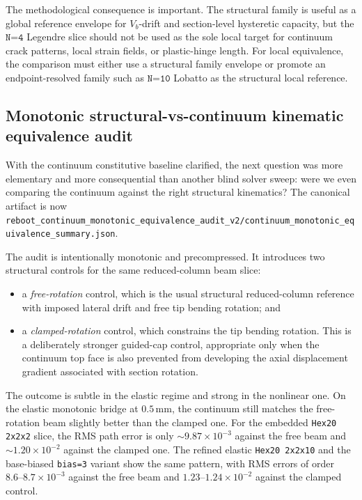 The methodological consequence is important.  The structural family is useful
as a global reference envelope for \(V_b\)-drift and section-level hysteretic
capacity, but the \(\texttt{N=4}\) Legendre slice should not be used as the
sole local target for continuum crack patterns, local strain fields, or
plastic-hinge length.  For local equivalence, the comparison must either use a
structural family envelope or promote an endpoint-resolved family such as
\(\texttt{N=10}\) Lobatto as the structural local reference.

\subsection{Monotonic structural-vs-continuum kinematic equivalence audit}

With the continuum constitutive baseline clarified, the next question was more
elementary and more consequential than another blind solver sweep: were we even
comparing the continuum against the right structural kinematics?  The
canonical artifact is now
\texttt{reboot\_continuum\_monotonic\_equivalence\_audit\_v2/continuum\_monotonic\_equivalence\_summary.json}.

The audit is intentionally monotonic and precompressed.  It introduces two
structural controls for the same reduced-column beam slice:
\begin{itemize}
  \item a \emph{free-rotation} control, which is the usual structural
    reduced-column reference with imposed lateral drift and free tip bending
    rotation; and
  \item a \emph{clamped-rotation} control, which constrains the tip bending
    rotation. This is a deliberately stronger guided-cap control, appropriate
    only when the continuum top face is also prevented from developing the
    axial displacement gradient associated with section rotation.
\end{itemize}

The outcome is subtle in the elastic regime and strong in the nonlinear one.
On the elastic monotonic bridge at \(0.5\,\mathrm{mm}\), the continuum still
matches the free-rotation beam slightly better than the clamped one.  For the
embedded \texttt{Hex20 2x2x2} slice, the RMS path error is only
\(\sim 9.87\times10^{-3}\) against the free beam and
\(\sim 1.20\times10^{-2}\) against the clamped one.  The refined elastic
\texttt{Hex20 2x2x10} and the base-biased \texttt{bias=3} variant show the
same pattern, with RMS errors of order \(8.6\text{--}8.7\times10^{-3}\)
against the free beam and \(1.23\text{--}1.24\times10^{-2}\) against the
clamped control.

